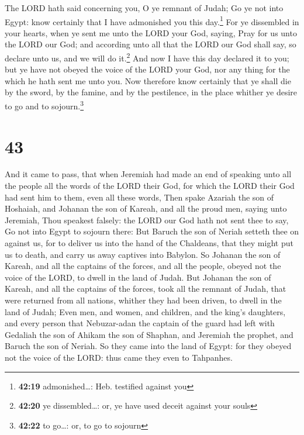  The LORD hath said concerning you, O ye remnant of
Judah; Go ye not into Egypt: know certainly that I have admonished you
this day.\footnote{\textbf{42:19} admonished\ldots: Heb. testified
  against you}  For ye dissembled in your hearts, when ye
sent me unto the LORD your God, saying, Pray for us unto the LORD our
God; and according unto all that the LORD our God shall say, so declare
unto us, and we will do it.\footnote{\textbf{42:20} ye dissembled\ldots:
  or, ye have used deceit against your souls}  And now I
have this day declared it to you; but ye have not obeyed the voice of
the LORD your God, nor any thing for the which he hath sent me unto you.
 Now therefore know certainly that ye shall die by the
sword, by the famine, and by the pestilence, in the place whither ye
desire to go and to sojourn.\footnote{\textbf{42:22} to go\ldots: or, to
  go to sojourn}

\hypertarget{section-42}{%
\section{43}\label{section-42}}

 And it came to pass, that when Jeremiah had made an end
of speaking unto all the people all the words of the LORD their God, for
which the LORD their God had sent him to them, even all these words,
 Then spake Azariah the son of Hoshaiah, and Johanan the
son of Kareah, and all the proud men, saying unto Jeremiah, Thou
speakest falsely: the LORD our God hath not sent thee to say, Go not
into Egypt to sojourn there:  But Baruch the son of Neriah
setteth thee on against us, for to deliver us into the hand of the
Chaldeans, that they might put us to death, and carry us away captives
into Babylon.  So Johanan the son of Kareah, and all the
captains of the forces, and all the people, obeyed not the voice of the
LORD, to dwell in the land of Judah.  But Johanan the son
of Kareah, and all the captains of the forces, took all the remnant of
Judah, that were returned from all nations, whither they had been
driven, to dwell in the land of Judah;  Even men, and
women, and children, and the king's daughters, and every person that
Nebuzar-adan the captain of the guard had left with Gedaliah the son of
Ahikam the son of Shaphan, and Jeremiah the prophet, and Baruch the son
of Neriah.  So they came into the land of Egypt: for they
obeyed not the voice of the LORD: thus came they even to Tahpanhes.

